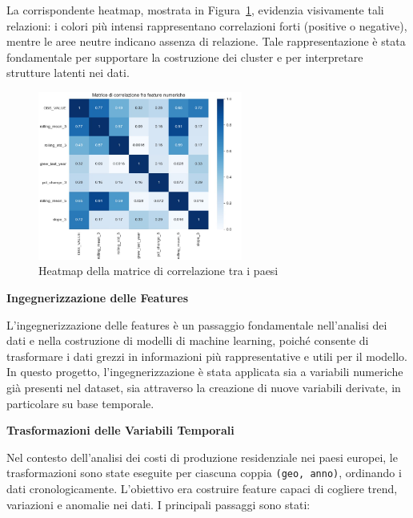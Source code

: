 \documentclass[conference]{IEEEtran}
\begin{document}
La corrispondente heatmap, mostrata in Figura~\ref{fig:correlation-heatmap}, evidenzia visivamente tali relazioni: i colori più intensi rappresentano correlazioni forti (positive o negative), mentre le aree neutre indicano assenza di relazione. Tale rappresentazione è stata fondamentale per supportare la costruzione dei cluster e per interpretare strutture latenti nei dati.

\begin{figure}[H]
\centering
\includegraphics[width=0.6\textwidth]{images/Matrix} %
\caption{Heatmap della matrice di correlazione tra i paesi}
\label{fig:correlation-heatmap}
\end{figure}

\vspace{1em} \noindent\textbf{Ingegnerizzazione delle Features}

L’ingegnerizzazione delle features è un passaggio fondamentale nell’analisi dei dati e nella costruzione di modelli di machine learning, poiché consente di trasformare i dati grezzi in informazioni più rappresentative e utili per il modello. In questo progetto, l’ingegnerizzazione è stata applicata sia a variabili numeriche già presenti nel dataset, sia attraverso la creazione di nuove variabili derivate, in particolare su base temporale.

\vspace{1em} \noindent\textbf{Trasformazioni delle Variabili Temporali}

Nel contesto dell’analisi dei costi di produzione residenziale nei paesi europei, le trasformazioni sono state eseguite per ciascuna coppia \texttt{(geo, anno)}, ordinando i dati cronologicamente. L’obiettivo era costruire feature capaci di cogliere trend, variazioni e anomalie nei dati. I principali passaggi sono stati:
\end{document}
